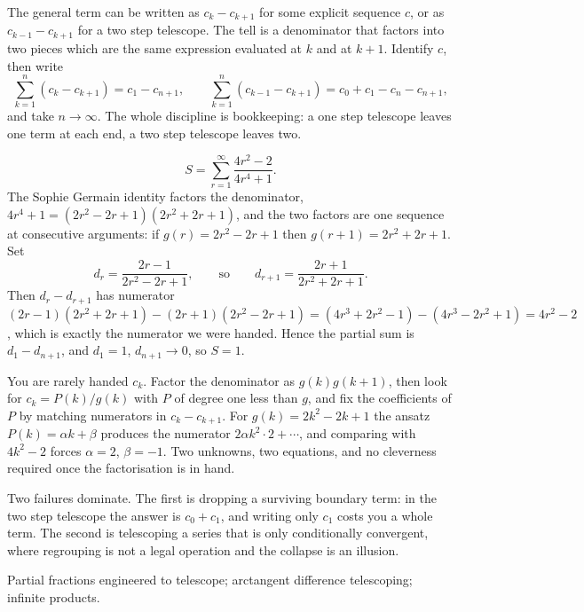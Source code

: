 \cue The general term can be written as $c_k-c_{k+1}$ for some explicit sequence $c$, or as $c_{k-1}-c_{k+1}$ for a two step telescope. The tell is a denominator that factors into two pieces which are the same expression evaluated at $k$ and at $k+1$.
\method Identify $c$, then write
\[\sum_{k=1}^{n}(c_k-c_{k+1})=c_1-c_{n+1},\qquad \sum_{k=1}^{n}(c_{k-1}-c_{k+1})=c_0+c_1-c_n-c_{n+1},\]
and take $n\to\infty$. The whole discipline is bookkeeping: a one step telescope leaves one term at each end, a two step telescope leaves two.

\begin{worked}
\[S=\sum_{r=1}^{\infty}\frac{4r^{2}-2}{4r^{4}+1}.\]
The Sophie Germain identity factors the denominator, $4r^{4}+1=(2r^{2}-2r+1)(2r^{2}+2r+1)$, and the two factors are one sequence at consecutive arguments: if $g(r)=2r^{2}-2r+1$ then $g(r+1)=2r^{2}+2r+1$. Set
\[d_r=\frac{2r-1}{2r^{2}-2r+1},\qquad\text{so}\qquad d_{r+1}=\frac{2r+1}{2r^{2}+2r+1}.\]
Then $d_r-d_{r+1}$ has numerator $(2r-1)(2r^{2}+2r+1)-(2r+1)(2r^{2}-2r+1)=(4r^{3}+2r^{2}-1)-(4r^{3}-2r^{2}+1)=4r^{2}-2$, which is exactly the numerator we were handed. Hence the partial sum is $d_1-d_{n+1}$, and $d_1=1$, $d_{n+1}\to0$, so $S=1$.
\end{worked}

\begin{keynote}
You are rarely handed $c_k$. Factor the denominator as $g(k)g(k+1)$, then look for $c_k=P(k)/g(k)$ with $P$ of degree one less than $g$, and fix the coefficients of $P$ by matching numerators in $c_k-c_{k+1}$. For $g(k)=2k^{2}-2k+1$ the ansatz $P(k)=\alpha k+\beta$ produces the numerator $2\alpha k^{2}\cdot 2+\cdots$, and comparing with $4k^{2}-2$ forces $\alpha=2$, $\beta=-1$. Two unknowns, two equations, and no cleverness required once the factorisation is in hand.
\end{keynote}

\begin{trap}
Two failures dominate. The first is dropping a surviving boundary term: in the two step telescope the answer is $c_0+c_1$, and writing only $c_1$ costs you a whole term. The second is telescoping a series that is only conditionally convergent, where regrouping is not a legal operation and the collapse is an illusion.
\end{trap}

\begin{seealsob}Partial fractions engineered to telescope; arctangent difference telescoping; infinite products.\end{seealsob}

